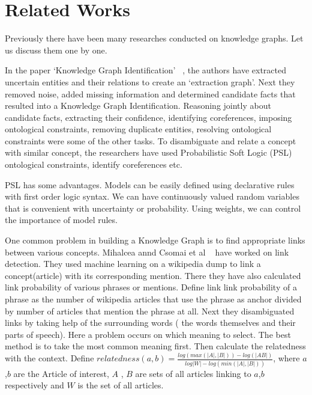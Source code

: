 \chapter{Related Works}\label{ch2}
Previously there have been many researches conducted on knowledge graphs.
Let us discuss them one by one.
 
In the paper `Knowledge Graph Identification' ~\cite{ref0kgi}, the authors have extracted uncertain
 entities and their relations to create an `extraction graph'.  Next they removed noise, added missing 
 information and determined candidate facts that resulted into a Knowledge Graph Identification. Reasoning 
 jointly about candidate facts, extracting their confidence, identifying coreferences, imposing 
 ontological constraints, removing duplicate entities, resolving ontological constraints
 were some of the other tasks. To disambiguate and relate a concept with similar concept,
the researchers have used Probabilistic Soft Logic (PSL) ~\cite{ref0psl}  ontological constraints,  
identify coreferences etc. 

PSL has some advantages. Models can be easily defined using declarative rules with first order logic syntax. 
We can have continuously valued random variables that is convenient with uncertainty or probability.
Using weights, we can control the importance of model rules.

One common problem in building a Knowledge Graph is to find appropriate links between various 
concepts. Mihalcea annd Csomai et al ~\cite{ref3LinkWikipedia} have worked on link detection. They used 
machine learning on a wikipedia dump to link a concept(article) with its corresponding mention. 
There they have also calculated 
link probability of various phrases or mentions. Define link link probability of a phrase as the 
number of wikipedia articles that use the phrase as anchor divided by  number of articles that mention the phrase at all.
Next they disambiguated links by taking help of the surrounding words 
( the words themselves and their parts of speech). Here a problem occurs on which meaning to select.
The best method is to take the most common meaning first. Then calculate the relatedness
with the context. Define $ relatedness(a,b) = \frac{log(max(|A|, |B|)) - log(|AB|)}{log|W|-log(min(|A|, |B|))} $,
where $a$,$b$ are the Article of interest, $A$ , $B$ are sets of all articles linking to $a$,$b$ respectively and $W$ 
is the set of all articles.

